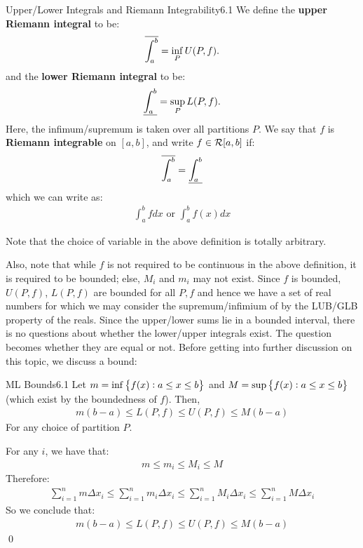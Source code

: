 \setcounter{rudin}{0}
\begin{definition}{Upper/Lower Integrals and Riemann Integrability}{6.1}
    We define the \textbf{upper Riemann integral} to be:
    \begin{align*}
        \overline{\int_{a}^{b}} = \inf_P U(P, f).
    \end{align*}
    and the \textbf{lower Riemann integral} to be:
    \begin{align*}
        \underline{\int_{a}^{b}} = \sup_P L(P, f).
    \end{align*}
    Here, the infimum/supremum is taken over all partitions $P$. We say that $f$ is \textbf{Riemann integrable} on $[a, b]$, and write $f \in \mathcal{R}[a, b]$ if:
    \begin{align*}
        \overline{\int_{a}^{b}} = \underline{\int_{a}^{b}}
    \end{align*}
    which we can write as:
    \begin{align*}
        \int_{a}^{b} f dx \text{ or } \int_{a}^{b} f(x) dx
    \end{align*}
\end{definition}
\noindent Note that the choice of variable in the above definition is totally arbitrary. 

Also, note that while $f$ is not required to be continuous in the above definition, it is required to be bounded; else, $M_i$ and $m_i$ may not exist. Since $f$ is bounded, $U(P, f)$, $L(P, f)$ are bounded for all $P, f$ and hence we have a set of real numbers for which we may consider the supremum/infimium of by the LUB/GLB property of the reals. Since the upper/lower sums lie in a bounded interval, there is no questions about whether the lower/upper integrals exist. The question becomes whether they are equal or not. Before getting into further discussion on this topic, we discuss a bound:

\setcounter{rudin}{0}
\begin{theorem}{ML Bounds}{6.1}
    Let $m = \inf\set{f(x): a \leq x \leq b}$ and $M = \sup\set{f(x): a \leq x \leq b}$ (which exist by the boundedness of $f$). Then,
    \begin{align*}
        m(b - a) \leq L(P, f) \leq U(P, f) \leq M(b - a)
    \end{align*}
    For any choice of partition $P$.
\end{theorem}
\begin{nproof}
    For any $i$, we have that:
    \begin{align*}
        m \leq m_i \leq M_i \leq M
    \end{align*}
    Therefore:
    \begin{align*}
        \sum_{i=1}^n m \Delta x_i \leq \sum_{i=1}^n m_i \Delta x_i \leq \sum_{i=1}^n M_i \Delta x_i \leq \sum_{i=1}^n M \Delta x_i
    \end{align*}
    So we conclude that:
    \begin{align*}
        m(b - a) \leq L(P, f) \leq U(P, f) \leq M(b - a)
    \end{align*} \qed
\end{nproof}

